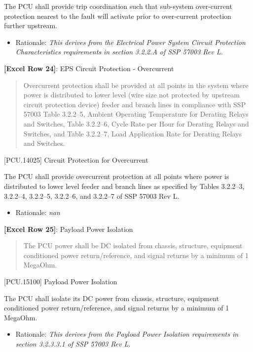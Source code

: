 The PCU shall provide trip coordination such that sub-system over-current protection nearest to the fault will activate prior to over-current protection further upstream.

\begin{itemize}
\item{} Rationale: \emph{This derives from the Electrical Power System Circuit Protection Characteristics requirements in section 3.2.2.A of SSP 57003 Rev L.}

\end{itemize}

\textbf{[Excel Row 24]}: EPS Circuit Protection - Overcurrent

\begin{quote}
Overcurrent protection shall be provided at all points in the system where power is distributed to lower level (wire size not protected by upstream circuit protection device) feeder and branch lines in compliance with SSP 57003 Table 3.2.2--5, Ambient Operating Temperature for Derating Relays and Switches, Table 3.2.2--6, Cycle Rate per Hour for Derating Relays and Switches, and Table 3.2.2--7, Load Application Rate for Derating Relays and Switches.
\end{quote}

[PCU.14025] Circuit Protection for Overcurrent

The PCU shall provide overcurrent protection at all points where power is distributed to lower level feeder and branch lines as specified by Tables 3.2.2--3, 3.2.2--4, 3.2.2--5, 3.2.2--6, and 3.2.2--7 of SSP 57003 Rev L.

\begin{itemize}
\item{} Rationale: \emph{nan}

\end{itemize}

\textbf{[Excel Row 25]}: Payload Power Isolation

\begin{quote}
The PCU power shall be DC isolated from chassis, structure, equipment conditioned power return\slash reference, and signal returns by a minimum of 1 MegaOhm.
\end{quote}

[PCU.15100] Payload Power Isolation

The PCU shall isolate its DC power from chassis, structure, equipment conditioned power return\slash reference, and signal returns by a minimum of 1 MegaOhm.

\begin{itemize}
\item{} Rationale: \emph{This derives from the Payload Power Isolation requirements in section 3.2.3.3.1 of SSP 57003 Rev L.}

\end{itemize}

